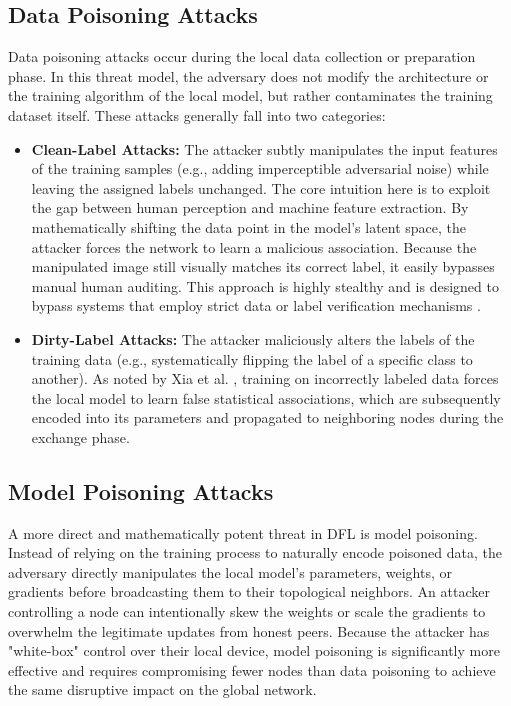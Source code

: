 \subsection{Data Poisoning Attacks}
Data poisoning attacks occur during the local data collection or preparation phase. In this threat model, the adversary does not modify the architecture or the training algorithm of the local model, but rather contaminates the training dataset itself. These attacks generally fall into two categories:
\begin{itemize}
    \item \textbf{Clean-Label Attacks:} The attacker subtly manipulates the input features of the training samples (e.g., adding imperceptible adversarial noise) while leaving the assigned labels unchanged. The core intuition here is to exploit the gap between human perception and machine feature extraction. By mathematically shifting the data point in the model's latent space, the attacker forces the network to learn a malicious association. Because the manipulated image still visually matches its correct label, it easily bypasses manual human auditing. This approach is highly stealthy and is designed to bypass systems that employ strict data or label verification mechanisms \cite{shafahi2018poison, zhu2019transferable}.
    \item \textbf{Dirty-Label Attacks:} The attacker maliciously alters the labels of the training data (e.g., systematically flipping the label of a specific class to another). As noted by Xia et al. \cite{xia2023poisoning}, training on incorrectly labeled data forces the local model to learn false statistical associations, which are subsequently encoded into its parameters and propagated to neighboring nodes during the exchange phase.
\end{itemize}

\subsection{Model Poisoning Attacks}
A more direct and mathematically potent threat in DFL is model poisoning. Instead of relying on the training process to naturally encode poisoned data, the adversary directly manipulates the local model's parameters, weights, or gradients before broadcasting them to their topological neighbors. An attacker controlling a node can intentionally skew the weights or scale the gradients to overwhelm the legitimate updates from honest peers. Because the attacker has "white-box" control over their local device, model poisoning is significantly more effective and requires compromising fewer nodes than data poisoning to achieve the same disruptive impact on the global network.

